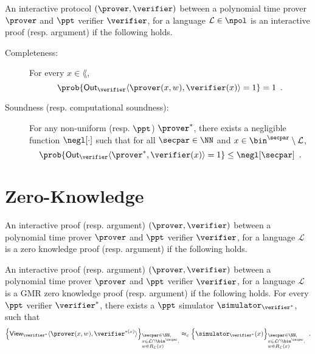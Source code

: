 \begin{definition}
		An interactive protocol $(\prover, \verifier)$ between a polynomial time prover $\prover$ and $\ppt$ verifier $\verifier$, for a language $\lang \in \npol$ is an interactive proof (resp. argument) if the following holds.
		\begin{description}
			\item[Completeness:] For every $x \in \lang$,
			\[
				\prob{\out_\verifier\langle \prover(x,w), \verifier(x)\rangle=1} =1\enspace.
			\]
			\item[Soundness (resp. computational soundness):] For any non-uniform (resp. $\ppt$) $\prover^*$, there exists a negligible function $\negl[\cdot ]$ such that for all $\secpar\in\NN$ and $ x \in \bin^{\secpar}\setminus \lang$,
			\[
				\prob{\out_\verifier\langle \prover^*, \verifier(x)\rangle=1} \le \negl[\secpar]\enspace.
			\]
		\end{description}
	\end{definition}


\section{Zero-Knowledge}

An interactive proof (resp. argument) $(\prover, \verifier)$ between a polynomial time prover $\prover$ and $\ppt$ verifier $\verifier$, for a language $\mathcal{L}$ is a zero knowledge proof (resp. argument) if the following holds.

\begin{definition}
	 An interactive proof (resp. argument) $(\prover, \verifier)$ between a polynomial time prover $\prover$ and $\ppt$ verifier $\verifier$, for a language $\mathcal{L}$ is a GMR zero knowledge proof (resp. argument) if the following holds. For every $\ppt$ verifier $\verifier^*$, there exists a $\ppt$ simulator $\simulator_{\verifier^*}$, such that 
	\[
	\Big\lbrace \view_{\verifier^{*}}\langle \prover(x,w), \verifier^{*(x)}\rangle \Big\rbrace_{\begin{subarray}{l}\secpar\in\NN,\\x\in \mathcal{L}\cap\bin^{\secpar},\\w \in R_\mathcal{L}(x)\end{subarray}} \approx_c \Big\lbrace \simulator_{\verifier^{*}}(x) \Big\rbrace_{\begin{subarray}{l}\secpar\in\NN,\\x\in \mathcal{L}\cap\bin^{\secpar},\\w \in R_\mathcal{L}(x)\end{subarray}}\enspace.
	\]		
\end{definition}


